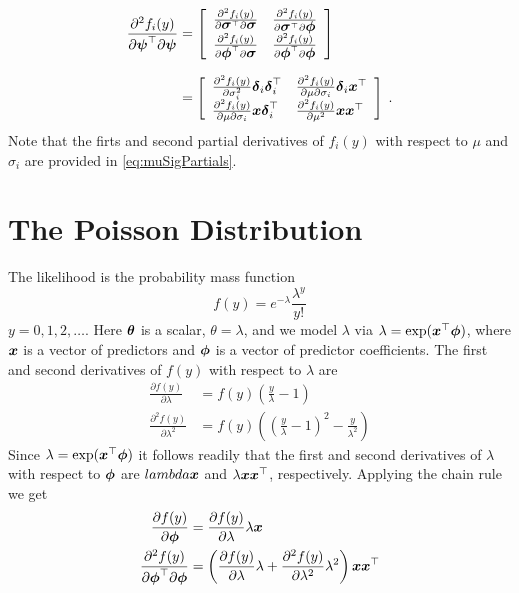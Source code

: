 \begin{align*}
\frac{\partial^2 f_i(y)}{\partial \mbox{$\boldsymbol{\psi}$}^{\top} \partial \mbox{$\boldsymbol{\psi}$}} &=
\left[ \begin{array}{ll}
\frac{\partial^2 f_i(y)}{\partial \mbox{$\boldsymbol{\sigma}$}^{\top} \partial \mbox{$\boldsymbol{\sigma}$}} &
\frac{\partial^2 f_i(y)}{\partial \mbox{$\boldsymbol{\sigma}$}^{\top} \partial \mbox{$\boldsymbol{\phi}$}} \\
\frac{\partial^2 f_i(y)}{\partial \mbox{$\boldsymbol{\phi}$}^{\top} \partial \mbox{$\boldsymbol{\sigma}$}} &
\frac{\partial^2 f_i(y)}{\partial \mbox{$\boldsymbol{\phi}$}^{\top} \partial \mbox{$\boldsymbol{\phi}$}}
\end{array} \right] \\[0.25cm]
& = \left[ \begin{array}{ll}
           \frac{\partial^2 f_i(y)}{\partial \sigma_i^2}
           \mbox{$\boldsymbol{\delta}$}_i \mbox{$\boldsymbol{\delta}$}_i^{\top} &
           \frac{\partial^2 f_i(y)}{\partial \mu \partial \sigma_i}
           \mbox{$\boldsymbol{\delta}$}_i \mbox{$\boldsymbol{x}$}^{\top} \\
           \frac{\partial^2 f_i(y)}{\partial \mu \partial \sigma_i}
           \mbox{$\boldsymbol{x}$} \mbox{$\boldsymbol{\delta}$}_i^{\top} &
           \frac{\partial^2 f_i(y)}{\partial \mu^2}
           \mbox{$\boldsymbol{x}$} \mbox{$\boldsymbol{x}$}^{\top} \\
           \end{array} \right] \; .
\end{align*}
Note that the firts and second partial derivatives of
$f_i(y)$ with respect to $\mu$ and $\sigma_i$ are provided in
\eqref{eq:muSigPartials}.

\section{The Poisson Distribution}

The likelihood is the probability mass function
\[
f(y) = e^{-\lambda} \frac{\lambda^y}{y!}
\]
$y = 0, 1, 2, \ldots$.  Here $\mbox{$\boldsymbol{\theta}$}$ is a scalar, $\theta = \lambda$,
and we model $\lambda$ via $\lambda = \exp(\mbox{$\boldsymbol{x}$}^{\top} \mbox{$\boldsymbol{\phi}$})$, where
$\mbox{$\boldsymbol{x}$}$ is a vector of predictors and $\mbox{$\boldsymbol{\phi}$}$ is a vector
of predictor coefficients.  The first and second derivatives of $f(y)$
with respect to $\lambda$ are
\begin{align*}
\frac{\partial f(y)}{\partial \lambda} &=
     f(y) \left (\frac{y}{\lambda} - 1 \right ) \\
\frac{\partial^2 f(y)}{\partial \lambda^2} &=
     f(y) \left( \left(\frac{y}{\lambda} - 1 \right)^2 - \frac{y}{\lambda^2} \right)
\end{align*}
Since $\lambda = \exp(\mbox{$\boldsymbol{x}$}^{\top} \mbox{$\boldsymbol{\phi}$})$ it follows readily that
the first and second derivatives of $\lambda$ with respect to $\mbox{$\boldsymbol{\phi}$}$
are $lambda \mbox{$\boldsymbol{x}$}$ and $\lambda \mbox{$\boldsymbol{x}$} \mbox{$\boldsymbol{x}$}^{\top}$, respectively.
Applying the chain rule we get
\begin{align*}
\frac{\partial f(y)}{\partial \mbox{$\boldsymbol{\phi}$}} &=
\frac{\partial f(y)}{\partial \lambda} \lambda \mbox{$\boldsymbol{x}$} \\
\frac{\partial^2 f(y)}{\partial \mbox{$\boldsymbol{\phi}$}^{\top} \partial \mbox{$\boldsymbol{\phi}$}} &=
\left(\frac{\partial f(y)}{\partial \lambda} \lambda +
      \frac{\partial^2 f(y)}{\partial \lambda^2} \lambda^2 \right) \mbox{$\boldsymbol{x}$} \mbox{$\boldsymbol{x}$}^{\top}
\end{align*}

